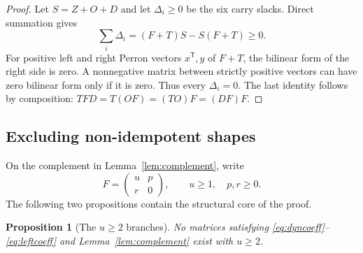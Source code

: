 \documentclass[11pt]{article}
\newtheorem{proposition}[theorem]{Proposition}
\theoremstyle{definition}
\newcommand{\mat}[4]{\begin{pmatrix}#1&#2\\#3&#4\end{pmatrix}}
\begin{document}
\begin{proof}
Let $S=Z+O+D$ and let $\Delta_i\ge0$ be the six carry slacks.  Direct
summation gives
\[
 \sum_i\Delta_i=(F+T)S-S(F+T)\ge0.
\]
For positive left and right Perron vectors $x^{\mathsf T},y$ of $F+T$,
the bilinear form of the right side is zero.  A nonnegative matrix between
strictly positive vectors can have zero bilinear form only if it is zero.
Thus every $\Delta_i=0$.  The last identity follows by composition:
$TFD=T(OF)=(TO)F=(DF)F$.
\end{proof}

\subsection{Excluding non-idempotent shapes}

On the complement in Lemma~\ref{lem:complement}, write
\[
 F=\mat{u}{p}{r}{0},\qquad u\ge1,\quad p,r\ge0.
\]
The following two propositions contain the structural core of the proof.

\begin{proposition}[The $u\ge2$ branches]\label{prop:uge2}
No matrices satisfying \eqref{eq:dyncoeff}--\eqref{eq:leftcoeff} and
Lemma~\ref{lem:complement} exist with $u\ge2$.
\end{proposition}
\end{document}
